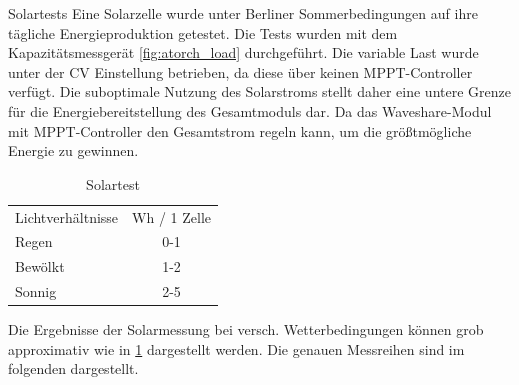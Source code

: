 Solartests
Eine Solarzelle wurde unter Berliner Sommerbedingungen auf ihre tägliche Energieproduktion getestet. Die Tests wurden mit dem Kapazitätsmessgerät \ref{fig:atorch_load} durchgeführt.
Die variable Last wurde unter der \ac{CV} Einstellung betrieben, da diese über keinen MPPT-Controller verfügt.
Die suboptimale Nutzung des Solarstroms stellt daher eine untere Grenze für die Energiebereitstellung des Gesamtmoduls dar. Da das Waveshare-Modul mit MPPT-Controller den Gesamtstrom regeln kann, um die größtmögliche Energie zu gewinnen.


\begin{table}[h!]
    \centering
    \begin{tabular}{lc}
            Lichtverhältnisse&Wh / 1 Zelle \\
 Regen& 0-1\\
            Bewölkt&1-2\\
            Sonnig&2-5\\
    \end{tabular}
    \caption{Solartest}
    \label{tab:sol_cond}
\end{table}
Die Ergebnisse der Solarmessung bei versch. Wetterbedingungen können grob approximativ wie in \ref{tab:sol_cond} dargestellt werden. Die genauen Messreihen sind im folgenden dargestellt.

